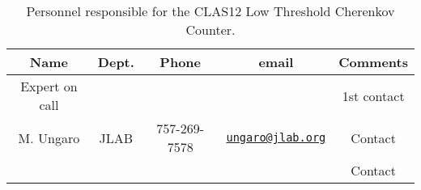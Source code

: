 \begin{table}[!htb]
 \centering
 \begin{tabular}{|c|c|c|c|c|}
\hline
 Name&Dept.&Phone&email&Comments \\ \hline
 Expert on call& &&& 1st contact \\ \hline
M. Ungaro&JLAB&757-269-7578&\href{mailto:ungaro@jlab.org}{\nolinkurl{ungaro@jlab.org}}&Contact \\ \hline
 & &&\href{mailto:}{\nolinkurl{}}& Contact  \\ \hline
 \end{tabular}
\caption{Personnel responsible for the CLAS12 Low Threshold Cherenkov Counter.} 
\label{tb:ltcc}
\end{table}

